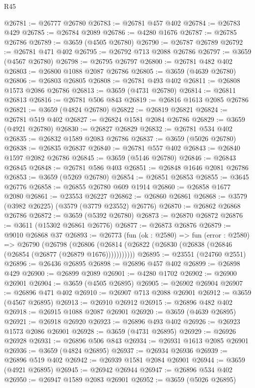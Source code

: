 \begin{lexlean}{R45}
\begin{coremodule}
@26781 := @26777 @26780
@26783 := @26781 @457 @402
@26784 := @26783 @429
@26785 := @26784 @2089
@26786 := @4280 @1676
@26787 := @26785 @26786
@26789 := @3659 (@4505 @26780)
@26790 := @26787 @26789
@26792 := @26781 @471 @402
@26795 := @26792 @713 @2088 @26786
@26797 := @3659 (@4567 @26780)
@26798 := @26795 @26797
@26800 := @26781 @482 @402
@26803 := @26800 @1088 @2087 @26786
@26805 := @3659 (@4639 @26780)
@26806 := @26803 @26805
@26808 := @26781 @493 @402
@26811 := @26808 @1573 @2086 @26786
@26813 := @3659 (@4731 @26780)
@26814 := @26811 @26813
@26816 := @26781 @506 @843
@26819 := @26816 @1613 @2085 @26786
@26821 := @3659 (@4824 @26780)
@26822 := @26819 @26821
@26824 := @26781 @519 @402
@26827 := @26824 @1581 @2084 @26786
@26829 := @3659 (@4921 @26780)
@26830 := @26827 @26829
@26832 := @26781 @534 @402
@26835 := @26832 @1589 @2083 @26786
@26837 := @3659 (@5026 @26780)
@26838 := @26835 @26837
@26840 := @26781 @557 @402
@26843 := @26840 @1597 @2082 @26786
@26845 := @3659 (@5146 @26780)
@26846 := @26843 @26845
@26848 := @26781 @586 @403
@26851 := @26848 @1646 @2081 @26786
@26853 := @3659 (@5269 @26780)
@26854 := @26851 @26853
@26855 := @3645 @26776
@26858 := @26855 @26780 @609 @1914
@26860 := @26858 @1677 @2080
@26861 := @23553 @26227
@26862 := @26860 @26861
@26868 := @3579 (@3982 @26225) (@3579 (@3779 @23552) @26776)
@26870 := @26862 @26868 @26786
@26872 := @3659 (@5392 @26780)
@26873 := @26870 @26872
@26876 := @3611 (@15302 @26861 @26776)
@26877 := @26873 @26876
@26879 := @9010 @26868 @37
@26893 := @26773
    (fun (ok : @2580) =>
    fun (error : @2580) =>
    @26790
      (@26798
        (@26806 (@26814 (@26822 (@26830 (@26838 (@26846 (@26854 (@26877 (@26879 @1676)))))))))))
@26895 := @23551 (@24760 @2551)
@26896 := @26436 @26895
@26898 := @26896 @457 @402
@26899 := @26898 @429
@26900 := @26899 @2089
@26901 := @4280 @1702
@26902 := @26900 @26901
@26904 := @3659 (@4505 @26895)
@26905 := @26902 @26904
@26907 := @26896 @471 @402
@26910 := @26907 @713 @2088 @26901
@26912 := @3659 (@4567 @26895)
@26913 := @26910 @26912
@26915 := @26896 @482 @402
@26918 := @26915 @1088 @2087 @26901
@26920 := @3659 (@4639 @26895)
@26921 := @26918 @26920
@26923 := @26896 @493 @402
@26926 := @26923 @1573 @2086 @26901
@26928 := @3659 (@4731 @26895)
@26929 := @26926 @26928
@26931 := @26896 @506 @843
@26934 := @26931 @1613 @2085 @26901
@26936 := @3659 (@4824 @26895)
@26937 := @26934 @26936
@26939 := @26896 @519 @402
@26942 := @26939 @1581 @2084 @26901
@26944 := @3659 (@4921 @26895)
@26945 := @26942 @26944
@26947 := @26896 @534 @402
@26950 := @26947 @1589 @2083 @26901
@26952 := @3659 (@5026 @26895)

\end{coremodule}
\end{lexlean}

